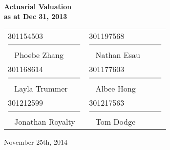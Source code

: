 \documentclass{report}
\begin{document}
\large{}

\begin{titlepage}
\color{bleu}


\vspace*{3cm} \Huge
\begin{leftbar}
{\normalfont\sffamily\Huge\bfseries\color{bleu}Actuarial Valuation \\ as at Dec 31, 2013}
\end{leftbar}


\vspace{15mm}
\begin{table}[ht]
\large
\begin{tabular}{p{5cm} p{5cm}}
\hspace{5mm}301154503 & \hspace{5mm} 301197568 \\
$\overline{\mbox{ \hspace{35mm} }}$ & $\overline{\mbox{ \hspace{35mm} }}$ \\ \mbox{ } Phoebe Zhang & \mbox{ } Nathan Esau\vspace{9mm} \\
\hspace{5mm} 301168614 & \hspace{5mm} 301177603 \\
$\overline{\mbox{ \hspace{35mm} }}$ & $\overline{\mbox{ \hspace{35mm} }}$ \\ \mbox{ } Layla Trummer & \mbox{ } Albee Hong\vspace{9mm} \\ 
\hspace{5mm} 301212599 & \hspace{5mm} 301217563 \\ 
$\overline{\mbox{ \hspace{35mm} }}$ & $\overline{\mbox{ \hspace{35mm} }}$ \\ \mbox{ } Jonathan Royalty & \mbox{ } Tom Dodge \vspace{9mm} \\ 
\end{tabular}
\end{table}

\vspace{3mm}
{\color{black}\large
November 25th, 2014}

\end{titlepage}
\end{document}
